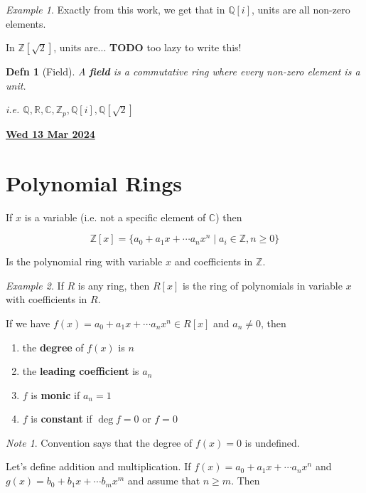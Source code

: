 \documentclass[12pt]{article}
\renewcommand{\date}[1]{\underline{\bf #1}}
\def\Z{{\mathbb Z}}
\def\Q{{\mathbb Q}}
\def\R{{\mathbb R}}
\def\C{{\mathbb C}}
\def\TODO{\color{red}\textbf{TODO}\color{black}}
\newtheorem{definition}{Defn}
\theoremstyle{remark}
\theoremstyle{remark}
\theoremstyle{remark}
\newtheorem{example}{Example}
\theoremstyle{remark}
\theoremstyle{remark}
\newtheorem*{note}{Note}
\begin{document}
\begin{example}
  Exactly from this work, we get that in $\Q[i]$, units are all non-zero
  elements.

  In $\Z[\sqrt{2}]$, units are... \TODO{} too lazy to write this!
\end{example}

\begin{definition}[Field]
  A {\bf field} is a commutative ring where every non-zero element is a unit.

  i.e. $\Q, \R, \C, \Z_p, \Q[i], \Q[\sqrt{2}]$
\end{definition}

\date{Wed 13 Mar 2024}


\section{Polynomial Rings}

If $x$ is a variable (i.e. not a specific element of $\C$) then

\[
  \Z[x] = \{ a_0 + a_1 x + \cdots a_n x^n \mid a_i \in \Z, n \ge 0 \}
\]

Is the polynomial ring with variable $x$ and coefficients in $\Z$.

\begin{example}
  If $R$ is any ring, then $R[x]$ is the ring of polynomials in variable $x$
  with coefficients in $R$.
\end{example}

If we have $f(x) = a_0 + a_1 x + \cdots a_n x^n \in R[x]$ and $a_n \ne 0$, then

\begin{enumerate}
  \item the {\bf degree} of $f(x)$ is $n$
  \item the {\bf leading coefficient} is $a_n$
  \item $f$ is {\bf monic} if $a_n = 1$
  \item $f$ is {\bf constant} if $\deg f = 0$ or $f = 0$
\end{enumerate}

\begin{note}
  Convention says that the degree of $f(x) = 0$ is undefined.
\end{note}

Let's define addition and multiplication. If $f(x) = a_0 + a_1 x + \cdots a_n
x^n$ and $g(x) = b_0 + b_1 x + \cdots b_m x^m$ and assume that $n \ge m$. Then 
\end{document}

